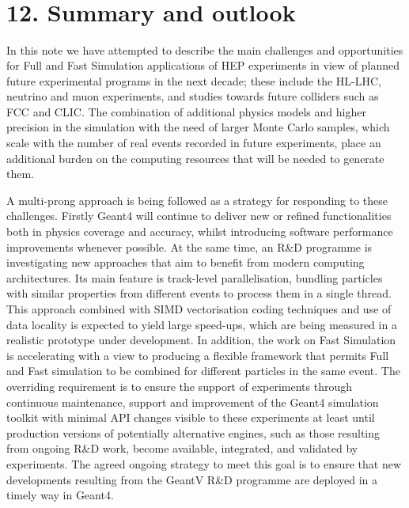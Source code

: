 \documentclass[12pt,a4paper]{article}
\begin{document}
\hypertarget{section-8}{%
\section{\texorpdfstring{\\
}{ }}\label{section-8}}

\hypertarget{summary-and-outlook}{%
\section{12. Summary and outlook}\label{summary-and-outlook}}

In this note we have attempted to describe the main challenges and
opportunities for Full and Fast Simulation applications of HEP
experiments in view of planned future experimental programs in the next
decade; these include the HL-LHC, neutrino and muon experiments, and
studies towards future colliders such as FCC and CLIC. The combination
of additional physics models and higher precision in the simulation with
the need of larger Monte Carlo samples, which scale with the number of
real events recorded in future experiments, place an additional burden
on the computing resources that will be needed to generate them.

A multi-prong approach is being followed as a strategy for responding to
these challenges. Firstly Geant4 will continue to deliver new or refined
functionalities both in physics coverage and accuracy, whilst
introducing software performance improvements whenever possible. At the
same time, an R\&D programme is investigating new approaches that aim to
benefit from modern computing architectures. Its main feature is
track-level parallelisation, bundling particles with similar properties
from different events to process them in a single thread. This approach
combined with SIMD vectorisation coding techniques and use of data
locality is expected to yield large speed-ups, which are being measured
in a realistic prototype under development. In addition, the work on
Fast Simulation is accelerating with a view to producing a flexible
framework that permits Full and Fast simulation to be combined for
different particles in the same event. The overriding requirement is to
ensure the support of experiments through continuous maintenance,
support and improvement of the Geant4 simulation toolkit with minimal
API changes visible to these experiments at least until production
versions of potentially alternative engines, such as those resulting
from ongoing R\&D work, become available, integrated, and validated by
experiments. The agreed ongoing strategy to meet this goal is to ensure
that new developments resulting from the GeantV R\&D programme are
deployed in a timely way in Geant4.
\end{document}
